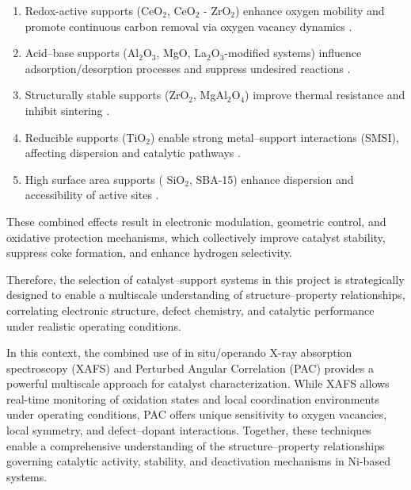 \begin{enumerate}[label=(\alph*)]
        \item Redox-active supports (CeO$_2$, CeO$_2$ - ZrO$_2$) enhance oxygen mobility and promote continuous carbon removal via oxygen vacancy dynamics \cite{Chirinos2025}.
        
        \item Acid–base supports (Al$_2$O$_3$, MgO, La$_2$O$_3$-modified systems) influence adsorption/desorption processes and suppress undesired reactions \cite{SUN2025}.

        \item Structurally stable supports (ZrO$_2$, MgAl$_2$O$_4$) improve thermal resistance and inhibit sintering \cite{TIAN2021}.

        \item Reducible supports (TiO$_2$) enable strong metal–support interactions (SMSI), affecting dispersion and catalytic pathways \cite{Sebastian2026}.

        \item High surface area supports ( SiO$_2$, SBA-15) enhance dispersion and accessibility of active sites \cite{KIM2015}.
\end{enumerate}

These combined effects result in electronic modulation, geometric control, and oxidative protection mechanisms, which collectively improve catalyst stability, suppress coke formation, and enhance hydrogen selectivity.

Therefore, the selection of catalyst–support systems in this project is strategically designed to enable a multiscale understanding of structure–property relationships, correlating electronic structure, defect chemistry, and catalytic performance under realistic operating conditions.

In this context, the combined use of in situ/operando X-ray absorption spectroscopy (XAFS) and Perturbed Angular Correlation (PAC) provides a powerful multiscale approach for catalyst characterization. While XAFS allows real-time monitoring of oxidation states and local coordination environments under operating conditions, PAC offers unique sensitivity to oxygen vacancies, local symmetry, and defect–dopant interactions. Together, these techniques enable a comprehensive understanding of the structure–property relationships governing catalytic activity, stability, and deactivation mechanisms in Ni-based systems.

